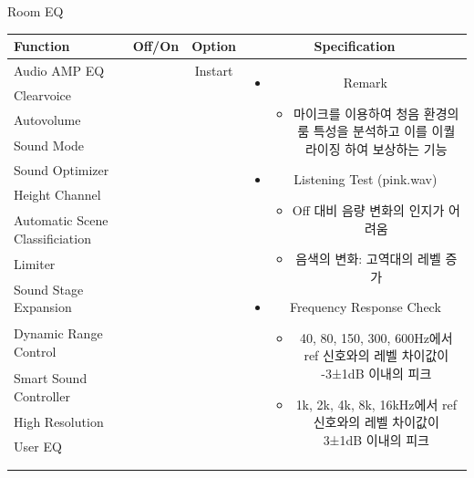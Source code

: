 \documentclass{beamer}
\begin{document}
	
	\begin{frame}[t]{Room EQ}
		\begin{tiny}
			\begin{tabular}{@{}lccc@{}}
				\toprule
				Function & Off/On & Option & Specification \\
				\midrule
				Audio AMP EQ & \color{black}{Off} & Instart &
				\multirow{14}{60mm}{
					\begin{itemize}
						\item Remark
						\begin{itemize}
							\item 마이크를 이용하여 청음 환경의 룸 특성을 분석하고 이를 이퀄라이징 하여 보상하는 기능
						\end{itemize}
						\item Listening Test (pink.wav)
						\begin{itemize}
							\item Off 대비 음량 변화의 인지가 어려움
							\item 음색의 변화: 고역대의 레벨 증가
						\end{itemize}
						\item Frequency Response Check
						\begin{itemize}
							\item 40, 80, 150, 300, 600Hz에서 ref 신호와의 레벨 차이값이 -3±1dB 이내의 피크
							\item 1k, 2k, 4k, 8k, 16kHz에서 ref 신호와의 레벨 차이값이 3±1dB 이내의 피크
						\end{itemize}
					\end{itemize}
				} \\
				Clearvoice & \color{black}{Off} & & \\
				Autovolume & \color{black}{Off} & & \\
				Sound Mode & \color{black}{Off} & & \\
				Sound Optimizer & \color{black}{Off} & & \\
				Height Channel & \color{black}{Off} & & \\
				Automatic Scene Classificiation & \color{black}{Off} & & \\
				Limiter & \color{black}{Off} & & \\
				Sound Stage Expansion & \color{black}{Off} & & \\
				Dynamic Range Control & \color{black}{Off} & & \\
				Smart Sound Controller & \color{black}{Off} & & \\
				High Resolution & \color{black}{Off} & & \\
				User EQ & \color{black}{Off} & & \\
				\color{blue}{Room EQ} & \color{blue}{On} & & \\
				\color{blue}{OSD Volume} & \color{blue}{On} &  \color{blue}{Vol.40} & \\
				\midrule
			\end{tabular}
		\end{tiny}
		

\end{frame}
\end{document}
